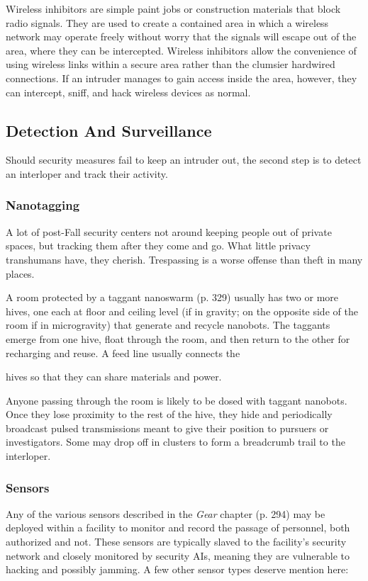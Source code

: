 Wireless inhibitors are simple paint jobs or construction materials that block radio signals. They are used to create a contained area in which a wireless network may operate freely without worry that the signals will escape out of the area, where they can be intercepted. Wireless inhibitors allow the convenience of using wireless links within a secure area rather than the clumsier hardwired connections. If an intruder manages to gain access inside the area, however, they can intercept, sniff, and hack wireless devices as normal. 

\subsection{Detection And Surveillance} 

Should security measures fail to keep an intruder out, the second step is to detect an interloper and track their activity. 

\subsubsection{Nanotagging} 

A lot of post-Fall security centers not around keeping people out of private spaces, but tracking them after they come and go. What little privacy transhumans have, they cherish. Trespassing is a worse offense than theft in many places. 

A room protected by a taggant nanoswarm (p. 329) usually has two or more hives, one each at floor and ceiling level (if in gravity; on the opposite side of the room if in microgravity) that generate and recycle nanobots. The taggants emerge from one hive, float through the room, and then return to the other for recharging and reuse. A feed line usually connects the 

hives so that they can share materials and power. 

Anyone passing through the room is likely to be dosed with taggant nanobots. Once they lose proximity to the rest of the hive, they hide and periodically broadcast pulsed transmissions meant to give their position to pursuers or investigators. Some may drop off in clusters to form a breadcrumb trail to the interloper. 

\subsubsection{Sensors} 

Any of the various sensors described in the \textit{Gear} chapter (p. 294) may be deployed within a facility to monitor and record the passage of personnel, both authorized and not. These sensors are typically slaved to the facility's security network and closely monitored by security AIs, meaning they are vulnerable to hacking and possibly jamming. A few other sensor types deserve mention here: 

